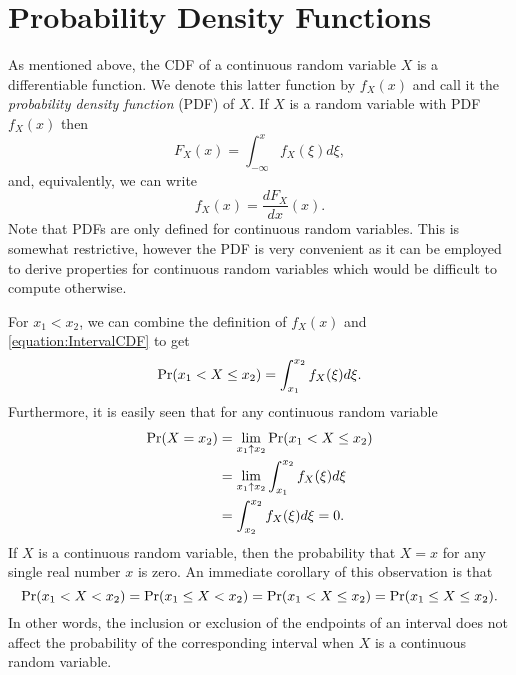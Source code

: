 \section{Probability Density Functions}

As mentioned above, the CDF of a continuous random variable $X$ is a differentiable function.
We denote this latter function by $f_X (x)$ and call it the \emph{probability density function} (PDF) of $X$.
If $X$ is a random variable with PDF $f_X (x)$ then
\begin{equation*}
F_X (x) = \int_{- \infty}^x f_X (\xi) d\xi ,
\end{equation*}
and, equivalently, we can write
\begin{equation*}
f_X (x) = \frac{d F_X}{dx} (x) .
\end{equation*}
Note that PDFs are only defined for continuous random variables.
This is somewhat restrictive, however the PDF is very convenient as it can be employed to derive properties for continuous random variables which would be difficult to compute otherwise.

For $x_1 < x_2$, we can combine the definition of $f_X(x)$ and \eqref{equation:IntervalCDF} to get
\begin{equation*}
\Pr (x_1 < X \leq x_2) = \int_{x_1}^{x_2} f_X (\xi) d\xi .
\end{equation*}
Furthermore, it is easily seen that for any continuous random variable
\begin{equation*}
\begin{split}
\Pr (X = x_2) &= \lim_{x_1 \uparrow x_2} \Pr (x_1 < X \leq x_2) \\
&= \lim_{x_1 \uparrow x_2} \int_{x_1}^{x_2} f_X (\xi) d\xi \\
&= \int_{x_2}^{x_2} f_X (\xi) d\xi = 0.
\end{split}
\end{equation*}
If $X$ is a continuous random variable, then the probability that $X = x$ for any single real number $x$ is zero.
An immediate corollary of this observation is that
\begin{equation*}
\Pr (x_1 < X < x_2)
= \Pr (x_1 \leq X < x_2)
= \Pr (x_1 < X \leq x_2)
= \Pr (x_1 \leq X \leq x_2) .
\end{equation*}
In other words, the inclusion or exclusion of the endpoints of an interval does not affect the probability of the corresponding interval when $X$ is a continuous random variable.

